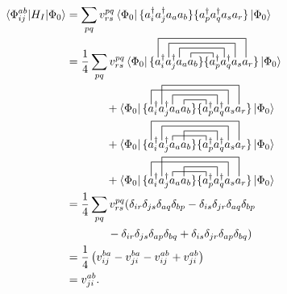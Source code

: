 \documentclass[Dual]{msu-thesis}
\begin{document}
\begin{align}
\mel*{\Phi^{ab}_{ij}}{H_I}{\Phi_0}
&=
\sum_{pq}v^{pq}_{rs}\bra{\Phi_0}\{a^\dagger_ia^\dagger_ja_aa_b\}\{a^\dagger_{p}a^\dagger_{q}a_{s}a_{r}\}\ket{\Phi_0}
\\
&=
\frac{1}{4}\sum_{pq}v^{pq}_{rs}\bra{\Phi_0}
\contraction[1ex]
{\{a^\dagger_ia^\dagger_ja_a}{a}{_b\}\{}{a}
\contraction[2ex]
{\{a^\dagger_ia^\dagger_j}{a}{_aa_b\}\{a^\dagger_{p}}{a}
\contraction[3ex]
{\{a^\dagger_i}{a}{^\dagger_ja_aa_b\}\{a^\dagger_{p}a^\dagger_{q}}{a}
\contraction[4ex]
{\{}{a}{^\dagger_ia^\dagger_ja_aa_b\}\{a^\dagger_{p}a^\dagger_{q}a_{s}}{a}
\{a^\dagger_ia^\dagger_ja_aa_b\}\{a^\dagger_{p}a^\dagger_{q}a_{s}a_{r}\}
\ket{\Phi_0}
\nonumber
\\
&\hspace{12.5mm}+
\bra{\Phi_0}
\contraction[1ex]
{\{a^\dagger_ia^\dagger_ja_a}{a}{_b\}\{}{a}
\contraction[2ex]
{\{a^\dagger_ia^\dagger_j}{a}{_aa_b\}\{a^\dagger_{p}}{a}
\contraction[3ex]
{\{}{a}{^\dagger_ia^\dagger_ja_aa_b\}\{a^\dagger_{p}a^\dagger_{q}}{a}
\contraction[4ex]
{\{a^\dagger_i}{a}{^\dagger_ja_aa_b\}\{a^\dagger_{p}a^\dagger_{q}a_{s}}{a}
\{a^\dagger_ia^\dagger_ja_aa_b\}\{a^\dagger_{p}a^\dagger_{q}a_{s}a_{r}\}
\ket{\Phi_0}
\nonumber
\\
&\hspace{12.5mm}+
\bra{\Phi_0}
\contraction[1ex]
{\{a^\dagger_ia^\dagger_j}{a}{_aa_b\}\{}{a}
\contraction[2ex]
{\{a^\dagger_ia^\dagger_ja_a}{a}{_b\}\{a^\dagger_{p}}{a}
\contraction[3ex]
{\{a^\dagger_i}{a}{^\dagger_ja_aa_b\}\{a^\dagger_{p}a^\dagger_{q}}{a}
\contraction[4ex]
{\{}{a}{^\dagger_ia^\dagger_ja_aa_b\}\{a^\dagger_{p}a^\dagger_{q}a_{s}}{a}
\{a^\dagger_ia^\dagger_ja_aa_b\}\{a^\dagger_{p}a^\dagger_{q}a_{s}a_{r}\}
\ket{\Phi_0}
\nonumber
\\
&\hspace{12.5mm}+
\bra{\Phi_0}
\contraction[1ex]
{\{a^\dagger_ia^\dagger_j}{a}{_aa_b\}\{}{a}
\contraction[2ex]
{\{a^\dagger_ia^\dagger_ja_a}{a}{_b\}\{a^\dagger_{p}}{a}
\contraction[3ex]
{\{}{a}{^\dagger_ia^\dagger_ja_aa_b\}\{a^\dagger_{p}a^\dagger_{q}}{a}
\contraction[4ex]
{\{a^\dagger_i}{a}{^\dagger_ja_aa_b\}\{a^\dagger_{p}a^\dagger_{q}a_{s}}{a}
\{a^\dagger_ia^\dagger_ja_aa_b\}\{a^\dagger_{p}a^\dagger_{q}a_{s}a_{r}\}
\ket{\Phi_0}
\\
&=
\frac{1}{4}\sum_{pq}v^{pq}_{rs}
(
\delta_{ir}\delta_{js}\delta_{aq}\delta_{bp}
-
\delta_{is}\delta_{jr}\delta_{aq}\delta_{bp}
\nonumber
\\
&\hspace{13mm}-
\delta_{ir}\delta_{js}\delta_{ap}\delta_{bq}
+
\delta_{is}\delta_{jr}\delta_{ap}\delta_{bq}
)
\\
&=
\frac{1}{4}\left(v^{ba}_{ij}-v^{ba}_{ji}-v^{ab}_{ij}+v^{ab}_{ji}\right)
\\
&=
v^{ab}_{ji}.
\end{align}
\end{document}
